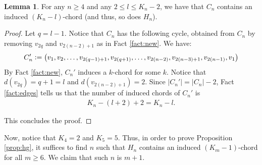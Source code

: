 \documentclass[12pt]{article}
\theoremstyle{definition}
\newtheorem{lemma}[thm]{Lemma}
\newcommand{\defeq}{\vcentcolon=}
\begin{document}
    \begin{lemma} \label{lemma:most}
        For any  $n \geq 4$ and
        any $2 \leq l \leq K_{n}-2$,
        we have that $C_{n}$ contains an induced
        $\left(K_{n} - l\right)$-chord
        (and thus, so does $H_{n}$).
    \end{lemma}
    \begin{proof}
        Let $q = l-1$. Notice that
        $C_{n}$ has the following
        cycle, obtained from $C_{n}$
        by removing $v_{2q}$ and
        $v_{2\left(n-2\right)+1}$
        as in Fact \ref{fact:new}.
        We have:
        \begin{gather*}
            C_{n}' \defeq
            \left(v_1, v_2, \ldots,
            v_{2\left(q-1\right)+1},
            v_{2\left(q+1\right)}, \ldots ,
            v_{2\left(n-2\right)},
            v_{2\left(n-3\right) + 1},
            v_{2\left(n-1\right)}, v_1\right)
        \end{gather*}
        By Fact \ref{fact:new}, 
        $C_{n}'$ induces a $k$-chord
        for some $k$.
        Notice that
        $d\left(v_{2q}\right) = q+1 = l$
        and $d\left(v_{2\left(n-2\right)+1}\right) = 2$.
        Since $\left|C_{n}'\right| = 
        \left|C_{n}\right| - 2$, 
        Fact \ref{fact:edges} tells
        us that the number of 
        induced chords of $C_{n}'$ is
        \begin{gather*}
            K_{n} - \left(l + 2\right) + 2 = K_{n} - l.
        \end{gather*}
        
        This concludes the proof.
    \end{proof}

    Now, notice that $K_{4} = 2$ and $K_{5} = 5$.
    Thus, in order to prove Proposition \ref{prop:hg},
    it suffices to find $n$ such that $H_{n}$ contains
    an induced $\left(K_{m}-1\right)$-chord for
    all $m \geq 6$. We claim that such $n$ is $m+1$.
\end{document}
